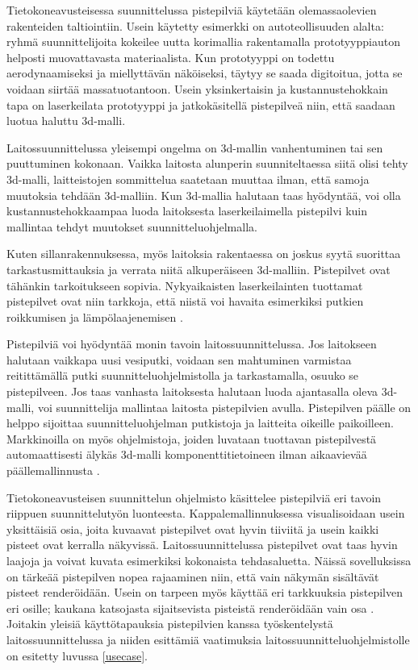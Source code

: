 Tietokoneavusteisessa suunnittelussa pistepilviä käytetään olemassaolevien rakenteiden taltiointiin. Usein käytetty esimerkki on autoteollisuuden alalta: ryhmä suunnittelijoita kokeilee uutta korimallia rakentamalla prototyyppiauton helposti muovattavasta materiaalista. Kun prototyyppi on todettu aerodynaamiseksi ja miellyttävän näköiseksi, täytyy se saada digitoitua, jotta se voidaan siirtää massatuotantoon. Usein yksinkertaisin ja kustannustehokkain tapa on laserkeilata prototyyppi ja jatkokäsitellä pistepilveä niin, että saadaan luotua haluttu 3d-malli.

Laitossuunnittelussa yleisempi ongelma on 3d-mallin vanhentuminen tai sen puuttuminen kokonaan. Vaikka laitosta alunperin suunniteltaessa siitä olisi tehty 3d-malli, laitteistojen sommittelua saatetaan muuttaa ilman, että samoja muutoksia tehdään 3d-malliin. Kun 3d-mallia halutaan taas hyödyntää, voi olla kustannustehokkaampaa luoda laitoksesta laserkeilaimella pistepilvi kuin mallintaa tehdyt muutokset suunnitteluohjelmalla. \cite{Piipponen}

Kuten sillanrakennuksessa, myös laitoksia rakentaessa on joskus syytä suorittaa tarkastusmittauksia ja verrata niitä alkuperäiseen 3d-malliin. Pistepilvet ovat tähänkin tarkoitukseen sopivia. Nykyaikaisten laserkeilainten tuottamat pistepilvet ovat niin tarkkoja, että niistä voi havaita esimerkiksi putkien roikkumisen ja lämpölaajenemisen \cite{Piipponen}. 

Pistepilviä voi hyödyntää monin tavoin laitossuunnittelussa. Jos laitokseen halutaan vaikkapa uusi vesiputki, voidaan sen mahtuminen varmistaa reitittämällä putki suunnitteluohjelmistolla ja tarkastamalla, osuuko se pistepilveen. Jos taas vanhasta laitoksesta halutaan luoda ajantasalla oleva 3d-malli, voi suunnittelija mallintaa laitosta pistepilvien avulla. Pistepilven päälle on helppo sijoittaa suunnitteluohjelman putkistoja ja laitteita oikeille paikoilleen. Markkinoilla on myös ohjelmistoja, joiden luvataan tuottavan pistepilvestä automaattisesti älykäs 3d-malli komponenttitietoineen ilman aikaavievää päällemallinnusta \cite{aveva}. 

Tietokoneavusteisen suunnittelun ohjelmisto käsittelee pistepilviä eri tavoin riippuen suunnittelutyön luonteesta. Kappalemallinnuksessa visualisoidaan usein yksittäisiä osia, joita kuvaavat pistepilvet ovat hyvin tiiviitä ja usein kaikki pisteet ovat kerralla näkyvissä. Laitossuunnittelussa pistepilvet ovat taas hyvin laajoja ja voivat kuvata esimerkiksi kokonaista tehdasaluetta. Näissä sovelluksissa on tärkeää pistepilven nopea rajaaminen niin, että vain näkymän sisältävät pisteet renderöidään. Usein on tarpeen myös käyttää eri tarkkuuksia pistepilven eri osille; kaukana katsojasta sijaitsevista pisteistä renderöidään vain osa \cite{mikko}. Joitakin yleisiä käyttötapauksia pistepilvien kanssa työskentelystä laitossuunnittelussa ja niiden esittämiä vaatimuksia laitossuunnitteluohjelmistolle on esitetty luvussa \ref{usecase}.


